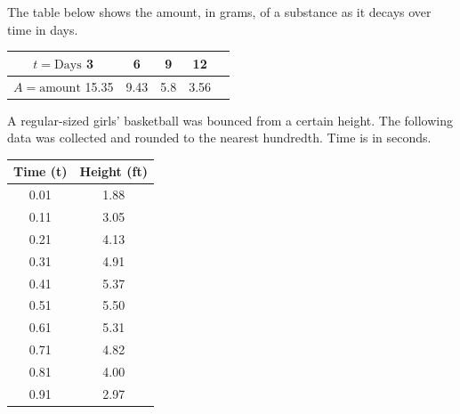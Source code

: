 \documentclass[12pt,addpoints]{exam}
\begin{document}
\begin{questions}
	\question The table below shows the amount, in grams, of a substance as it decays over time in days.
	\begin{tabular}{|c|c|c|c|c|} \hline
		$t = \text{Days}$ 3 & 6 & 9 & 12 \\ \hline
		$A = \text{amount}$ 15.35 & 9.43 & 5.8 & 3.56 \\ \hline
	\end{tabular}
	
	\newpage
	
	\question A regular-sized girls' basketball was bounced from a certain height. The following data was collected and rounded to the nearest hundredth. Time is in seconds.
	
	\begin{tabular}{|c|c|} \hline
	Time (t) & Height (ft) \\ \hline
	0.01 & 1.88 \\ \hline
	0.11 & 3.05 \\ \hline
	0.21 & 4.13 \\ \hline
	0.31 & 4.91 \\ \hline
	0.41 & 5.37 \\ \hline
	0.51 & 5.50 \\ \hline
	0.61 & 5.31 \\ \hline
	0.71 & 4.82 \\ \hline
	0.81 & 4.00 \\ \hline
	0.91 & 2.97 \\ \hline
	\end{tabular}
\end{questions}
\end{document}
